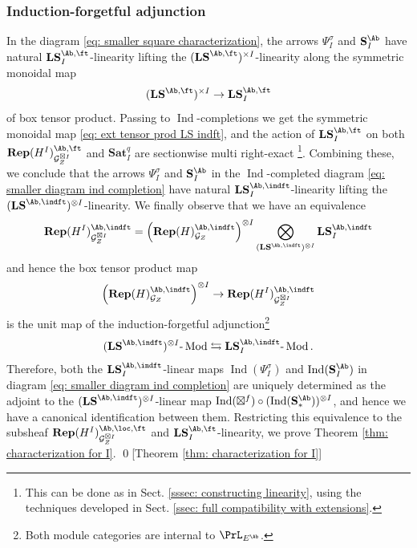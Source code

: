 \documentclass[10pt]{amsart}
\newcommand{\sssec}{\subsubsection}
\theoremstyle{remark}
\newcommand{\on}{\operatorname}
\newcommand{\cG}{\mathcal{G}}
\newcommand{\lMod}{\text{-}\on{Mod}}
\DeclareMathOperator{\Ind}{Ind}
\begin{document}
\sssec{Induction-forgetful adjunction}
In the diagram \eqref{eq: smaller square characterization}, the arrows $\Psi^{\sigma}_I$ and  $\mathbf{S}^{\Ab}_I$ have natural $\mathbf{LS}^{\Ab,\ft}_I$-linearity lifting the $(\mathbf{LS}^{\Ab,\ft})^{\times I}$-linearity along the symmetric monoidal map
\[(\mathbf{LS}^{\Ab,\ft})^{\times I}\rightarrow \mathbf{LS}^{\Ab,\ft}_I\]
of box tensor product. Passing to $\Ind$-completions we get the symmetric monoidal map \eqref{eq: ext tensor prod LS indft}, and the action of $\mathbf{LS}^{\Ab,\ft}_I$ on both $\mathbf{Rep}(H^I)^{\Ab,\ft}_{\cG^{\boxtimes I}_Z}$ and $\mathbf{Sat}^q_I$ are sectionwise multi right-exact \footnote{This can be done as in Sect. \ref{sssec: constructing linearity}, using the techniques developed in Sect. \ref{ssec: full compatibility with extensions}.}. Combining these, we conclude that the arrows $\Psi^{\sigma}_I$ and $\mathbf{S}^{\Ab}_I$ in the $\Ind$-completed diagram \eqref{eq: smaller diagram ind completion} have natural $\mathbf{LS}^{\Ab,\indft}_I$-linearity lifting the $(\mathbf{LS}^{\Ab,\indft})^{\otimes I}$-linearity. We finally observe that we have an equivalence
\[\mathbf{Rep}(H^I)^{\Ab,\indft}_{\cG^{\boxtimes I}_Z}= \left(\mathbf{Rep}(H)^{\Ab,\indft}_{\cG_Z}\right)^{\otimes I}\bigotimes_{(\mathbf{LS}^{\Ab,\indft})^{\otimes I}} \mathbf{LS}^{\Ab,\indft}_I\]
and hence the box tensor product map
\[\left(\mathbf{Rep}(H)^{\Ab,\indft}_{\cG_Z}\right)^{\otimes I}\rightarrow \mathbf{Rep}(H^I)^{\Ab,\indft}_{\cG^{\boxtimes I}_Z}\]
is the unit map of the induction-forgetful adjunction\footnote{Both module categories are internal to $\PrL_{E^{\Ab}}$.}
\[(\mathbf{LS}^{\Ab,\indft})^{\otimes I}\lMod\leftrightarrows \mathbf{LS}^{\Ab,\indft}_I\lMod.\]
Therefore, both the $\mathbf{LS}^{\Ab,\indft}_I$-linear maps $\Ind(\Psi^{\sigma}_I)$ and $\Ind(\mathbf{S}^{\Ab}_I)$ in diagram \eqref{eq: smaller diagram ind completion} are uniquely determined as the adjoint to the $(\mathbf{LS}^{\Ab,\indft})^{\otimes I}$-linear map $\Ind(\boxtimes^f)\circ (\Ind(\mathbf{S}^{\Ab}_{*}))^{\otimes I}$, and hence we have a canonical identification between them. Restricting this equivalence to the subsheaf $\mathbf{Rep}(H^I)^{\Ab,\loc,\ft}_{\cG^{\boxtimes I}_Z}$ and $\mathbf{LS}^{\Ab,\ft}_I$-linearity, we prove Theorem \ref{thm: characterization for I}. \qed[Theorem \ref{thm: characterization for I}]
\end{document}
